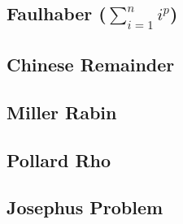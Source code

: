 \documentclass[a4paper,10pt,twocolumn,oneside]{article}
\begin{document}
% 

%

% 

\subsection{Faulhaber ($\sum\limits_{i=1}^{n}i^p$)}


\subsection{Chinese Remainder}


\subsection{Miller Rabin}


\subsection{Pollard Rho}


\subsection{Josephus Problem}


%

%
\end{document}
